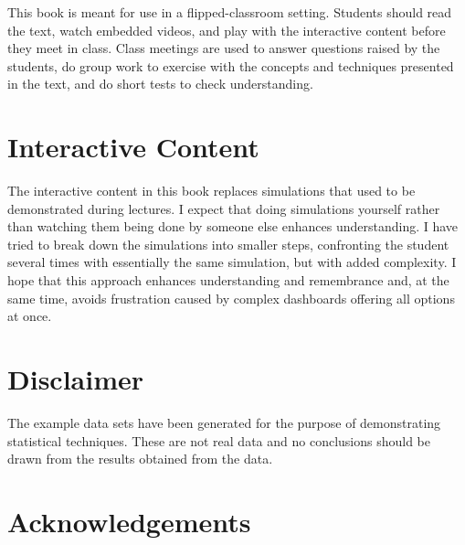 \documentclass[
  letterpaper,
  DIV=11,
  numbers=noendperiod]{scrreprt}
\begin{document}
This book is meant for use in a flipped-classroom setting. Students
should read the text, watch embedded videos, and play with the
interactive content before they meet in class. Class meetings are used
to answer questions raised by the students, do group work to exercise
with the concepts and techniques presented in the text, and do short
tests to check understanding.

\hypertarget{interactive-content}{%
\section*{Interactive Content}\label{interactive-content}}


The interactive content in this book replaces simulations that used to
be demonstrated during lectures. I expect that doing simulations
yourself rather than watching them being done by someone else enhances
understanding. I have tried to break down the simulations into smaller
steps, confronting the student several times with essentially the same
simulation, but with added complexity. I hope that this approach
enhances understanding and remembrance and, at the same time, avoids
frustration caused by complex dashboards offering all options at once.

\hypertarget{disclaimer}{%
\section*{Disclaimer}\label{disclaimer}}


The example data sets have been generated for the purpose of
demonstrating statistical techniques. These are not real data and no
conclusions should be drawn from the results obtained from the data.

\hypertarget{acknowledgements}{%
\section*{Acknowledgements}\label{acknowledgements}}

\end{document}
